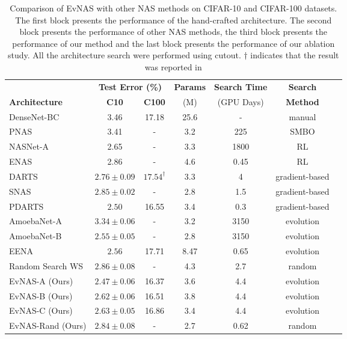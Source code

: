 \documentclass[final]{cvpr}
\begin{document}
\begin{table*}[t]
    \caption{Comparison of EvNAS with other NAS methods on CIFAR-10 and CIFAR-100 datasets. The
    first block presents the performance of the hand-crafted architecture. The second block
    presents the performance of other NAS methods, the third block presents the performance of our
    method and the last block presents the performance of our ablation study. All the architecture
    search were performed using cutout. $\dagger$ indicates that the result was reported in
    \cite{chen2019progressive}}
    \label{table:CIFAR10}
    \centering
    \begin{tabular}{lcccccc}
\hline
     & \multicolumn{2}{c}{\bf{Test Error (\%)}} & \bf{Params} & \bf{Search Time} &\bf{Search} \\
    \bf{Architecture} & \bf{C10} & \bf{C100} & (M) & (GPU Days) & \bf{Method} \\
\hline
    DenseNet-BC         \cite{huang2017densely}  & 3.46 & 17.18   & 25.6 & - & manual\\
    \hline
    PNAS            \cite{liu2018progressive}  &3.41 & - & 3.2 & 225 & SMBO\\
    NASNet-A   \cite{zoph2018learning}     & 2.65 & -     & 3.3  &1800& RL\\
    ENAS       \cite{pmlr-v80-pham18a}    & 2.86 & -       & 4.6  &0.45& RL\\
    DARTS      \cite{liu2018darts2} & $2.76\pm0.09$ & $17.54^{\dagger}$ & 3.3 &4& gradient-based\\
    SNAS       \cite{xie2018snas}          & $2.85\pm0.02$ & - & 2.8&1.5& gradient-based\\
    PDARTS     \cite{chen2019progressive}  & $2.50$ & 16.55        & 3.4 & 0.3 & gradient-based\\
    AmoebaNet-A\cite{real2019regularized}  & $3.34\pm0.06$ & - & 3.2 &3150& evolution\\
    AmoebaNet-B\cite{real2019regularized}  & $2.55\pm0.05$ & - & 2.8 &3150& evolution\\
    EENA       \cite{zhu2019eena}          & $2.56$ & 17.71 & 8.47 & 0.65 & evolution\\
    Random Search WS\cite{li2019random}         & $2.86\pm0.08$ & - & 4.3 &2.7& random\\
    \hline
    EvNAS-A (Ours)                       & $2.47\pm0.06$ & 16.37 & 3.6 & 4.4 & evolution\\
    EvNAS-B (Ours)                       & $2.62\pm0.06$ & 16.51 & 3.8 & 4.4 & evolution\\
    EvNAS-C (Ours)                       & $2.63\pm0.05$ & 16.86 & 3.4 & 4.4 & evolution\\
    \hline
    EvNAS-Rand (Ours)                       & $2.84\pm0.08$ & - & 2.7 &0.62& random\\
    

\end{tabular}
\end{table*}
\end{document}
